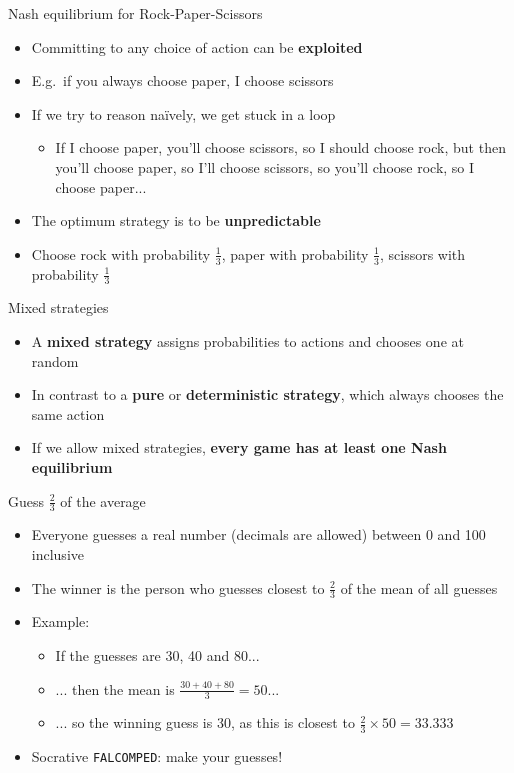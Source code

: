 \begin{frame}{Nash equilibrium for Rock-Paper-Scissors}
	\begin{itemize}
		\pause\item Committing to any choice of action can be \textbf{exploited}
		\pause\item E.g.\ if you always choose paper, I choose scissors
		\pause\item If we try to reason na\"ively, we get stuck in a loop
			\begin{itemize}
				\pause\item If I choose paper, you'll choose scissors, so I should choose rock, but then you'll choose paper,
					so I'll choose scissors, so you'll choose rock, so I choose paper...
			\end{itemize}
		\pause\item The optimum strategy is to be \textbf{unpredictable}
		\pause\item Choose rock with probability $\frac13$, paper with probability $\frac13$,
			scissors with probability $\frac13$
	\end{itemize}
\end{frame}

\begin{frame}{Mixed strategies}
	\begin{itemize}
		\pause\item A \textbf{mixed strategy} assigns probabilities to actions and chooses one at random
		\pause\item In contrast to a \textbf{pure} or \textbf{deterministic strategy}, which always chooses the same action
		\pause\item If we allow mixed strategies, \textbf{every game has at least one Nash equilibrium}
	\end{itemize}
\end{frame}

\begin{frame}{Guess $\frac23$ of the average}
	\begin{itemize}
		\pause\item Everyone guesses a real number (decimals are allowed) between 0 and 100 inclusive
		\pause\item The winner is the person who guesses closest to $\frac23$ of the mean of all guesses
		\pause\item Example:
			\begin{itemize}
				\pause\item If the guesses are 30, 40 and 80...
				\pause\item ... then the mean is $\frac{30+40+80}{3} = 50$...
				\pause\item ... so the winning guess is 30, as this is closest to $\frac23 \times 50 = 33.333$
			\end{itemize}
		\pause\item Socrative \texttt{FALCOMPED}: make your guesses!
	\end{itemize}
\end{frame}

